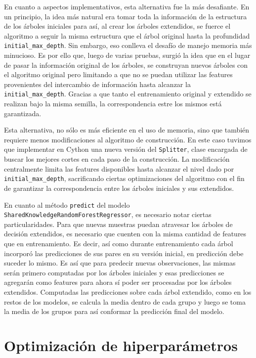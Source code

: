 En cuanto a aspectos implementativos, esta alternativa fue la más desafiante. En un principio, la idea más natural era tomar toda la información de la estructura de los árboles iniciales para así, al crear los árboles extendidos, se fuerce el algoritmo a seguir la misma estructura que el árbol original hasta la profundidad  \texttt{initial\_max\_depth}. Sin embargo, eso conlleva el desafío de manejo memoria más minucioso. Es por ello que, luego de varias pruebas, surgió la idea que en el lugar de pasar la información original de los árboles, se construyan nuevos árboles con el algoritmo original pero limitando a que no se puedan utilizar las features provenientes del intercambio de información hasta alcanzar la \texttt{initial\_max\_depth}. Gracias a que tanto el entrenamiento original y extendido se realizan bajo la misma semilla, la correspondencia estre los mismos está garantizada.

Esta alternativa, no sólo es más eficiente en el uso de memoria, sino que también requiere menos modificaciones al algoritmo de construcción. En este caso tuvimos que implementar en Cython una nueva versión del \texttt{Splitter}, clase encargada de buscar los mejores cortes en cada paso de la construcción. La modificación centralmente limita las features disponibles hasta alcanzar el nivel dado por \texttt{initial\_max\_depth}, sacrificando ciertas optimizaciones del algoritmo con el fin de garantizar la correspondencia entre los árboles iniciales y sus extendidos.

En cuanto al método \texttt{predict} del modelo \texttt{SharedKnowledgeRandomForestRegressor}, es necesario notar ciertas particularidades. Para que nuevas muestras puedan atravesar los árboles de decisión extendidos, es necesario que cuenten con la misma cantidad de features que en entrenamiento. Es decir, así como durante entrenamiento cada árbol incorporó las predicciones de sus pares en su versión inicial, en predicción debe suceder lo mismo. Es así que para predecir nuevas observaciones, las mismas serán primero computadas por los árboles iniciales y esas predicciones se agregarán como features para ahora sí poder ser procesadas por los árboles extendidos.
Computadas las predicciones sobre cada árbol extendido, como en los restos de los modelos, se calcula la media dentro de cada grupo y luego se toma la media de los grupos para así conformar la predicción final del modelo.

\section{Optimización de hiperparámetros}

